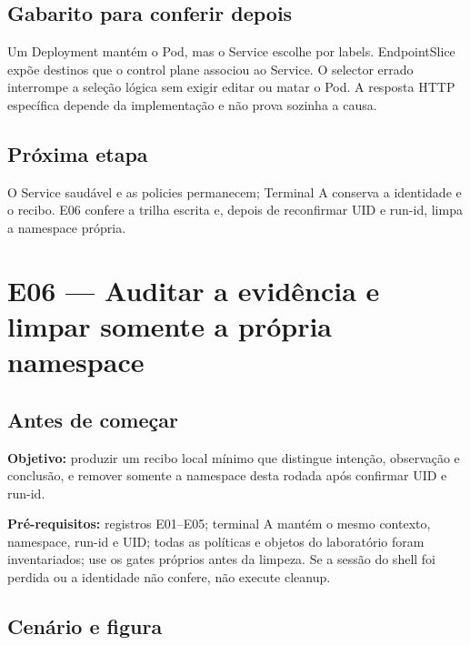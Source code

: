 \documentclass[12pt,openany,oneside,a4paper,chapter=TITLE,english,brazil]{abntex2}
\begin{document}
\section*{Gabarito para conferir depois}\label{gabarito-para-conferir-depois-4}

Um Deployment mantém o Pod, mas o Service escolhe por labels. EndpointSlice expõe destinos que o control plane associou ao Service. O selector errado interrompe a seleção lógica sem exigir editar ou matar o Pod. A resposta HTTP específica depende da implementação e não prova sozinha a causa.

\section*{Próxima etapa}\label{pruxf3xima-etapa-3}

O Service saudável e as policies permanecem; Terminal A conserva a identidade e o recibo. E06 confere a trilha escrita e, depois de reconfirmar UID e run-id, limpa a namespace própria.

\chapter*{E06 — Auditar a evidência e limpar somente a própria namespace}

\section*{Antes de começar}\label{antes-de-comeuxe7ar-5}

\textbf{Objetivo:} produzir um recibo local mínimo que distingue intenção, observação e conclusão, e remover somente a namespace desta rodada após confirmar UID e run-id.

\textbf{Pré-requisitos:} registros E01--E05; terminal A mantém o mesmo contexto, namespace, run-id e UID; todas as políticas e objetos do laboratório foram inventariados; use os gates próprios antes da limpeza. Se a sessão do shell foi perdida ou a identidade não confere, não execute cleanup.

\section*{Cenário e figura}\label{cenuxe1rio-e-figura-5}
\end{document}
